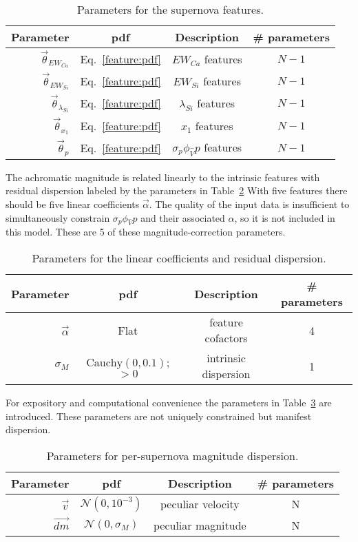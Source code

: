 \documentclass{aastex61}   	%
\begin{document}
\begin{table}
\begin{center}
\caption{Parameters for the supernova features.\label{feature:tab}}
\begin{tabular}{rccc}
\hline
Parameter & pdf & Description & \# parameters\\ \hline
$\vec{\theta}_{EW_{Ca}}$ & Eq.~\ref{feature:pdf} & ${EW}_{Ca}$ features & $N-1$ \\
$\vec{\theta}_{EW_{Si}}$ & Eq.~\ref{feature:pdf}& ${EW}_{Si}$ features & $N-1$ \\
$\vec{\theta}_{\lambda_{Si}}$ &Eq.~\ref{feature:pdf}& ${\lambda}_{Si}$ features & $N-1$ \\
$\vec{\theta}_{x_1}$ & Eq.~\ref{feature:pdf}& ${x}_{1}$ features & $N-1$ \\
$\vec{\theta}_{p}$ & Eq.~\ref{feature:pdf}& $\sigma_p\phi_{\hat{V}}  {p} $ features & $N-1$ \\
\hline
\end{tabular}
\end{center}
\end{table}

The achromatic magnitude is related linearly to the intrinsic features with residual dispersion labeled by the parameters in
Table~\ref{mag:tab}
With five features there should be five linear coefficients $\vec{\alpha}$.  The quality of the input data is insufficient to
simultaneously constrain $\sigma_p\phi_{\hat{V}}  {p}$ and their associated $\alpha$, so it is not included in this model.
These are 5 of these magnitude-correction parameters.
\begin{table}
\begin{center}
\caption{Parameters for the linear coefficients and residual dispersion.\label{mag:tab}}
\begin{tabular}{rccc}
\hline
Parameter & pdf & Description & \# parameters\\ \hline
$\vec{\alpha}$ & Flat& feature cofactors & 4 \\
$\sigma_M$ & $\text{Cauchy}(0, 0.1)$; $>0$ & intrinsic dispersion & 1\\
\hline
\end{tabular}
\end{center}
\end{table}

For expository and computational convenience the  parameters in Table~\ref{dispersion:tab} are introduced. 
These parameters are not uniquely constrained but manifest dispersion.
\begin{table}
\begin{center}
\caption{Parameters for per-supernova magnitude dispersion.\label{dispersion:tab}}
\begin{tabular}{rccc}
\hline
Parameter & pdf & Description & \# parameters\\ \hline
$\vec{v}$ & $\mathcal{N}(0,10^{-3})$ &  peculiar velocity & N \\\
$ \overrightarrow{dm}$ &  $\mathcal{N}(0,\sigma_M)$  &  peculiar magnitude & N \\
\hline
\end{tabular}
\end{center}
\end{table}
\end{document}
